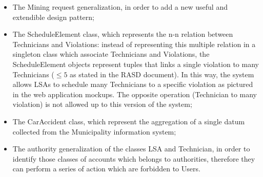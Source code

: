 \begin{itemize}
    \item The Mining request generalization, in order to add a new useful and extendible design pattern;
    \item The ScheduleElement class, which represents the n-n relation between Technicians and Violations: instead of representing this multiple relation in a singleton class which associate Technicians and Violations, the ScheduleElement objects represent tuples that links a single violation to many Technicians ($\le 5$ as stated in the RASD document). In this way, the system allows LSAs to schedule many Technicians to a specific violation as pictured in the web application mockups. The opposite operation (Technician to many violation) is not allowed up to this version of the system;
    \item The CarAccident class, which represent the aggregation of a single datum collected from the Municipality information system;
    \item The authority generalization of the classes LSA and Technician, in order to identify those classes of accounts which belongs to authorities, therefore they can perform a series of action which are forbidden to Users. 
\end{itemize}
